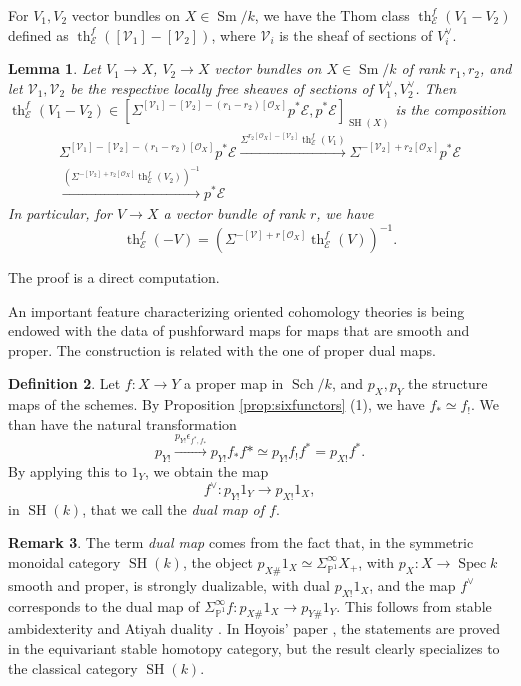 \documentclass[10pt]{amsart}
\theoremstyle{definition}
\newtheorem{defn}{Definition}[section]
\newtheorem{rmk}[defn]{Remark}
\theoremstyle{plain}
\newtheorem{lemma}[defn]{Lemma}
\numberwithin{equation}{section}
\newcommand{\0}{\emptyset}
\newcommand{\sE}{{\mathcal E}}
\newcommand{\sO}{{\mathcal O}}
\newcommand{\sV}{{\mathcal V}}
\renewcommand{\P}{{\mathbb P}}
\newcommand{\Spec}{{\operatorname{Spec}}}
\newcommand{\SH}{{\operatorname{SH}}}
\newcommand{\Sm}{{\operatorname{Sm}}}
\renewcommand{\th}{{\operatorname{th}}}
\newcommand{\Sch}{{\operatorname{Sch}}}
\begin{document}
For $V_1, V_2$ vector bundles on $X\in \Sm/k$, we have the Thom class $\th_{\sE}^f(V_1-V_2)$ defined as $\th_{\sE}^f([\sV_1]-[\sV_2])$, where $\sV_i$ is the sheaf of sections of $V_i^\vee$.
\begin{lemma}\label{lem:ThomClassVirtualBundles} Let $V_1\to X$, $V_2\to X$ vector bundles on $X\in \Sm/k$ of rank $r_1, r_2$, and let $\sV_1, \sV_2$ be the respective locally free sheaves of sections of $V_1^\vee, V_2^\vee$. Then $\th_{\sE}^f(V_1-V_2)\in [\Sigma^{[\sV_1]-[\sV_2]-(r_1-r_2)[\sO_X]}p^*\sE, p^*\sE]_{\SH(X)}$ is the composition
\begin{multline*}
    \Sigma^{[\sV_1]-[\sV_2]-(r_1-r_2)[\sO_X]}p^*\sE\xrightarrow{\Sigma^{r_2[\sO_X]-[\sV_2]}\th_{\sE}^f(V_1)}\Sigma^{-[\sV_2]+r_2[\sO_X]}p^*\sE \\ \xrightarrow{(\Sigma^{-[\sV_2]+r_2[\sO_X]}\th_{\sE}^f(V_2))^{-1}}p^*\sE
\end{multline*}
In particular, for $V\to X$ a vector bundle of rank $r$, we have
$$\th_{\sE}^f(-V)=(\Sigma^{-[\sV]+r[\sO_X]}\th_{\sE}^f(V))^{-1}.$$
\end{lemma} 

The proof is a direct computation.

An important feature characterizing oriented cohomology theories is being endowed with the data of pushforward maps for maps that are smooth and proper. The construction is related with the one of proper dual maps.

\begin{defn}
\label{defn:DualMap}
    Let $f:X \to Y$ a proper map in $\Sch/k$, and $p_X, p_Y$ the structure maps of the schemes. By Proposition \ref{prop:sixfunctors} (1), we have $f_*\simeq f_!$. We than have the natural transformation
  $$p_{Y!}\xrightarrow{p_{Y!}\epsilon_{f^*,f_*}}p_{Y!}f_*f* \simeq p_{Y!}f_!f^*=p_{X!}f^*.$$
    By applying this to $1_Y$, we obtain the map
    $$f^\vee: p_{Y!}1_Y \to p_{X!}1_X,$$
    in $\SH(k)$, that we call the \emph{dual map of $f$}.
\end{defn}

\begin{rmk}
    The term \emph{dual map} comes from the fact that, in the symmetric monoidal category $\SH(k)$, the object $p_{X\#}1_X \simeq \Sigma^\infty_{\P^1}X_+$, with $p_X:X \to \Spec k$ smooth and proper, is strongly dualizable, with dual $p_{X!}1_X$, and the map $f^\vee$ corresponds to the dual map of $\Sigma^\infty_{\P^1}f:p_{X\#}1_X \to p_{Y\#}1_Y$. This follows from stable ambidexterity \cite[Theorem 6.9]{Hoyois:6functors} and Atiyah duality \cite[Corollary 6.13]{Hoyois:6functors}. In Hoyois' paper \cite{Hoyois:6functors}, the statements are proved in the equivariant stable homotopy category, but the result clearly specializes to the classical category $\SH(k)$.    
\end{rmk}
\end{document}
